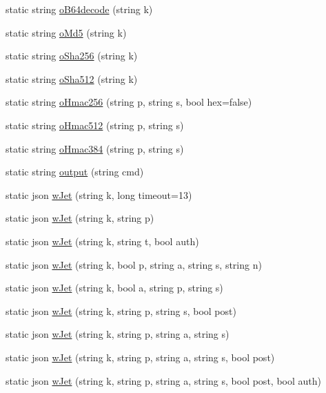 \begin{DoxyCompactItemize}
\item 
static string \hyperlink{class_k_1_1_f_n_a7d0940dbcd680f2b0f1698f407f0ad6f}{o\+B64decode} (string k)
\item 
static string \hyperlink{class_k_1_1_f_n_a82442456a74ace356f60a2c6d907a421}{o\+Md5} (string k)
\item 
static string \hyperlink{class_k_1_1_f_n_a8668abb434e8316627202df2d93d8a6a}{o\+Sha256} (string k)
\item 
static string \hyperlink{class_k_1_1_f_n_a981af6006d24e45aed12a6f18d1f42e0}{o\+Sha512} (string k)
\item 
static string \hyperlink{class_k_1_1_f_n_a05af96aaa10a37950cb128d44da09d2c}{o\+Hmac256} (string p, string s, bool hex=false)
\item 
static string \hyperlink{class_k_1_1_f_n_ac6c21d0743a06277a6013ac7b59b59d5}{o\+Hmac512} (string p, string s)
\item 
static string \hyperlink{class_k_1_1_f_n_ac7f32a87fb8ee80afe87aef14144c75d}{o\+Hmac384} (string p, string s)
\item 
static string \hyperlink{class_k_1_1_f_n_ab3fdd85f18a0ef53c8b2fab520722313}{output} (string cmd)
\item 
static json \hyperlink{class_k_1_1_f_n_a9abcc9b6ec123debc6fdb01b287f27a7}{w\+Jet} (string k, long timeout=13)
\item 
static json \hyperlink{class_k_1_1_f_n_a96eaac01bd3fe54e2f00af94ae98f7e6}{w\+Jet} (string k, string p)
\item 
static json \hyperlink{class_k_1_1_f_n_a8ee0e8aae4bfa054a0615e078cad4d4f}{w\+Jet} (string k, string t, bool auth)
\item 
static json \hyperlink{class_k_1_1_f_n_a9f6ace95f24096e70f4e729dee2094d9}{w\+Jet} (string k, bool p, string a, string s, string n)
\item 
static json \hyperlink{class_k_1_1_f_n_a42f6c1a3864f204756520e0e9f25944c}{w\+Jet} (string k, bool a, string p, string s)
\item 
static json \hyperlink{class_k_1_1_f_n_a4cbb8cb9a97200bf5dd14c8d0806ab4d}{w\+Jet} (string k, string p, string s, bool post)
\item 
static json \hyperlink{class_k_1_1_f_n_a3c0e2880afa0e2662fec10849c816481}{w\+Jet} (string k, string p, string a, string s)
\item 
static json \hyperlink{class_k_1_1_f_n_a2a256e086ceceadcf4f38f8df77bd5f1}{w\+Jet} (string k, string p, string a, string s, bool post)
\item 
static json \hyperlink{class_k_1_1_f_n_a1ef653dcd13e9627722d298fb3551765}{w\+Jet} (string k, string p, string a, string s, bool post, bool auth)

\end{DoxyCompactItemize}
